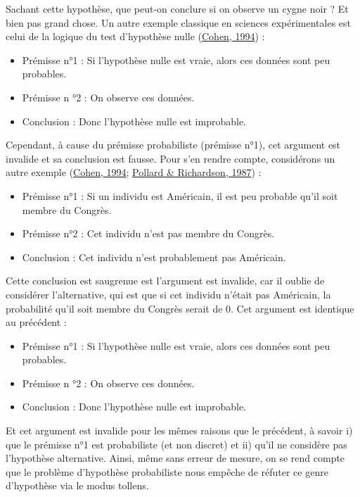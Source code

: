 \documentclass[
  a4paper,11pt,twoside,onecolumn,openright,final,oldfontcommands]{memoir}
\theoremstyle{definition}
\theoremstyle{definition}
\theoremstyle{definition}
\theoremstyle{definition}
\theoremstyle{remark}
\begin{document}
Sachant cette hypothèse, que peut-on conclure si on observe un cygne noir ? Et bien pas grand chose. Un autre exemple classique en sciences expérimentales est celui de la logique du test d'hypothèse nulle (\protect\hyperlink{ref-cohen_earth_1994}{Cohen, 1994}) :

\begin{itemize}
\item
  Prémisse n°1 : Si l'hypothèse nulle est vraie, alors ces données sont peu probables.
\item
  Prémisse n °2 : On observe ces données.
\item
  Conclusion : Donc l'hypothèse nulle est improbable.
\end{itemize}

Cependant, à cause du prémisse probabiliste (prémisse n°1), cet argument est invalide et sa conclusion est fausse. Pour s'en rendre compte, considérons un autre exemple (\protect\hyperlink{ref-cohen_earth_1994}{Cohen, 1994}; \protect\hyperlink{ref-pollard_probability_1987}{Pollard \& Richardson, 1987}) :

\begin{itemize}
\item
  Prémisse n°1 : Si un individu est Américain, il est peu probable qu'il soit membre du Congrès.
\item
  Prémisse n°2 : Cet individu n'est pas membre du Congrès.
\item
  Conclusion : Cet individu n'est probablement pas Américain.
\end{itemize}

Cette conclusion est saugrenue est l'argument est invalide, car il oublie de considérer l'alternative, qui est que si cet individu n'était pas Américain, la probabilité qu'il soit membre du Congrès serait de 0. Cet argument est identique au précédent :

\begin{itemize}
\item
  Prémisse n°1 : Si l'hypothèse nulle est vraie, alors ces données sont peu probables.
\item
  Prémisse n °2 : On observe ces données.
\item
  Conclusion : Donc l'hypothèse nulle est improbable.
\end{itemize}

Et cet argument est invalide pour les mêmes raisons que le précédent, à savoir i) que le prémisse n°1 est probabiliste (et non discret) et ii) qu'il ne considère pas l'hypothèse alternative. Ainsi, même sans erreur de mesure, on se rend compte que le problème d'hypothèse probabiliste nous empêche de réfuter ce genre d'hypothèse via le modus tollens.
\end{document}
